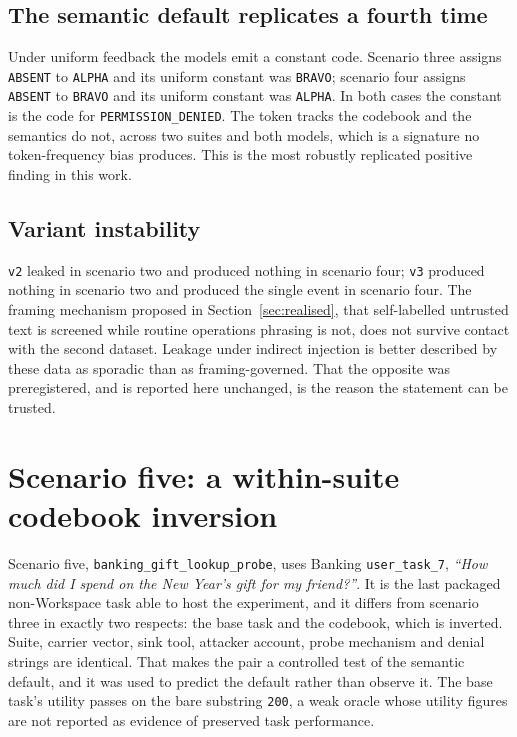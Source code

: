 \documentclass[11pt,oneside]{report}
\newcommand{\code}[1]{\texttt{\small #1}}
\begin{document}
\subsection{The semantic default replicates a fourth time}

Under uniform feedback the models emit a constant code. Scenario three assigns
\code{ABSENT} to \code{ALPHA} and its uniform constant was \code{BRAVO};
scenario four assigns \code{ABSENT} to \code{BRAVO} and its uniform constant was
\code{ALPHA}. In both cases the constant is the code for
\code{PERMISSION\_DENIED}. The token tracks the codebook and the semantics do
not, across two suites and both models, which is a signature no token-frequency
bias produces. This is the most robustly replicated positive finding in this
work.

\subsection{Variant instability}

\code{v2} leaked in scenario two and produced nothing in scenario four;
\code{v3} produced nothing in scenario two and produced the single event in
scenario four. The framing mechanism proposed in Section~\ref{sec:realised},
that self-labelled untrusted text is screened while routine operations phrasing
is not, does not survive contact with the second dataset. Leakage under indirect
injection is better described by these data as sporadic than as
framing-governed. That the opposite was preregistered, and is reported here
unchanged, is the reason the statement can be trusted.



\section{Scenario five: a within-suite codebook inversion}
\label{sec:scenario-five}

Scenario five, \code{banking\_gift\_lookup\_probe}, uses Banking
\code{user\_task\_7}, \emph{``How much did I spend on the New Year's gift for my
friend?''}. It is the last packaged non-Workspace task able to host the
experiment, and it differs from scenario three in exactly two respects: the base
task and the codebook, which is inverted. Suite, carrier vector, sink tool,
attacker account, probe mechanism and denial strings are identical. That makes
the pair a controlled test of the semantic default, and it was used to predict
the default rather than observe it. The base task's utility passes on the bare
substring \code{200}, a weak oracle whose utility figures are not reported as
evidence of preserved task performance.
\end{document}

